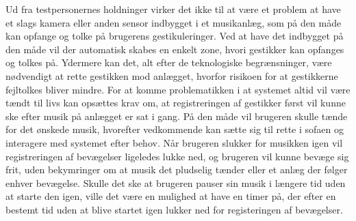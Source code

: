 Ud fra testpersonernes holdninger virker det ikke til at være et problem at have et slags kamera eller anden sensor indbygget i et musikanlæg, som på den måde kan opfange og tolke på brugerens gestikuleringer. Ved at have det indbygget på den måde vil der automatisk skabes en enkelt zone, hvori gestikker kan opfanges og tolkes på. Ydermere kan det, alt efter de teknologiske begrænsninger, være nødvendigt at rette gestikken mod anlægget, hvorfor risikoen for at gestikkerne fejltolkes bliver mindre. For at komme problematikken i at systemet altid vil være tændt til livs kan opsættes krav om, at registreringen af gestikker først vil kunne ske efter musik på anlægget er sat i gang. På den måde vil brugeren skulle tænde for det ønskede musik, hvorefter vedkommende kan sætte sig til rette i sofaen og interagere med systemet efter behov. Når brugeren slukker for musikken igen vil registreringen af bevægelser ligeledes lukke ned, og brugeren vil kunne bevæge sig frit, uden bekymringer om at musik det pludselig tænder eller et anlæg der følger enhver bevægelse. Skulle det ske at brugeren pauser sin musik i længere tid uden at starte den igen, ville det være en mulighed at have en timer på, der efter en bestemt tid uden at blive startet igen lukker ned for registeringen af bevægelser.  
